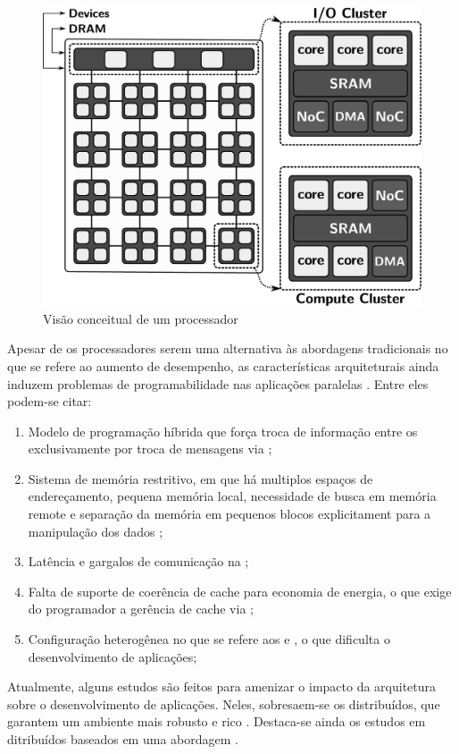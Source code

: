 \begin{figure}[bt]
	\label{fig.lw-overview}
	\centering
    \includegraphics[width=0.64\linewidth]{content/images/lw-overview-gs.jpg}
	\caption{Visão conceitual de um processador \lw \cite{penna2021inter}}
\end{figure}


Apesar de os processadores \lws serem uma alternativa às abordagens tradicionais no que se refere ao aumento de desempenho, as características arquiteturais ainda induzem problemas de programabilidade nas aplicações paralelas \cite{Castro-PARCO:2016}. Entre eles podem-se citar:

\begin{enumerate}[label= (\roman*)]
    \item Modelo de programação híbrida que força troca de informação entre os \clusters exclusivamente por troca de mensagens via \noc \cite{kelly2013};
    \item Sistema de memória restritivo, em que há multiplos espaços de endereçamento, pequena memória local, necessidade de busca em memória remote e separação da memória em pequenos blocos explicitament para a manipulação dos dados \cite{Castro-PARCO:2016};
    \item Latência e gargalos de comunicação na \noc;
    \item Falta de suporte de coerência de cache para economia de energia, o que exige do programador a gerência de cache via \software;
    \item Configuração heterogênea no que se refere aos \cclusters e \ioclusters, o que dificulta o desenvolvimento de aplicações;
\end{enumerate}

Atualmente, alguns estudos são feitos para amenizar o impacto da arquitetura sobre o desenvolvimento de aplicações. Neles, sobresaem-se os \oss distribuídos, que garantem um ambiente mais robusto e rico \cite{asmussen_m3:_2016, kluge_operating_2014, penna:sbesc19}. Destaca-se ainda os estudos em \oss ditribuídos baseados em uma abordagem \multikernel \cite{penna2017-1,penna2017-2,penna2019}.

